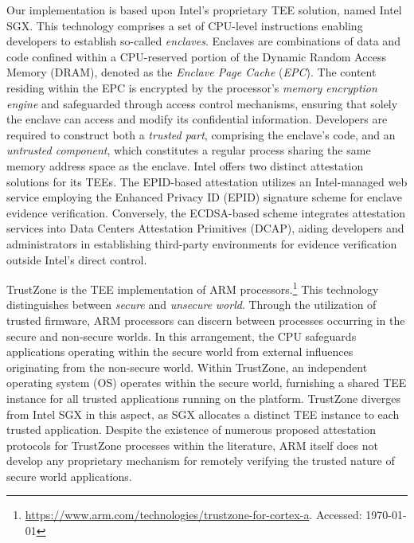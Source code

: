 \begin{newj}
Our implementation is based upon Intel's proprietary TEE solution, named Intel SGX. This technology comprises a set of CPU-level instructions enabling developers to establish so-called \emph{enclaves}. Enclaves are combinations of data and code confined within a CPU-reserved portion of the Dynamic Random Access Memory (DRAM), denoted as the \emph{Enclave Page Cache} (\emph{EPC}). The content residing within the EPC is encrypted by the processor's \emph{memory encryption engine} and safeguarded through access control mechanisms, ensuring that solely the enclave can access and modify its confidential information. %
Developers are required to construct both a \emph{trusted part}, comprising the enclave's code, and an \emph{untrusted component}, which constitutes a regular process sharing the same memory address space as the enclave. %
Intel offers two distinct attestation solutions for its TEEs. The EPID-based attestation utilizes an Intel-managed web service employing the Enhanced Privacy ID (EPID) signature scheme for enclave evidence verification. Conversely, the ECDSA-based scheme integrates attestation services into Data Centers Attestation Primitives (DCAP), aiding developers and administrators in establishing third-party environments for evidence verification outside Intel's direct control.


TrustZone is the TEE implementation of ARM processors.\footnote{\url{https://www.arm.com/technologies/trustzone-for-cortex-a}. Accessed: \today} This technology distinguishes between \emph{secure} and \emph{unsecure} \emph{world}. Through the utilization of trusted firmware, ARM processors can discern between processes occurring in the secure and non-secure worlds. In this arrangement, the CPU safeguards applications operating within the secure world from external influences originating from the non-secure world. Within TrustZone, an independent operating system (OS) operates within the secure world, furnishing a shared TEE instance for all trusted applications running on the platform. TrustZone diverges from Intel SGX in this aspect, as SGX allocates a distinct TEE instance to each trusted application. Despite the existence of numerous proposed attestation protocols for TrustZone processes within the literature, ARM itself does not develop any proprietary mechanism for remotely verifying the trusted nature of secure world applications.
\end{newj}
